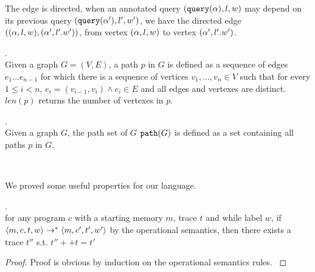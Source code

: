 \documentclass[a4paper,11pt]{article}
\begin{document}
The edge is directed, when an annotated query $({\tt query}({\alpha}),l,w)$ may depend on its previous query $({\tt query}({\alpha}'),l',w')$, we have the directed
edge $(({\alpha},l,w), ({\alpha}',l'.w'))$, 
from vertex $(\alpha,l,w) $ to vertex $({\alpha}',l'.w')$.
%
%
\begin{defn}[path ($p$)].
\\
Given a graph $G=(V,E)$, a path $p$ in $G$ is defined as a sequence of edges $e_1\ldots e_{n - 1}$ for which there is a sequence of vertices $v_1, \ldots, v_n \in V$ 
such that for every $1 \leq i < n$, $e_i=(v_{i-1},v_{i}) \land e_i \in E$  and all edges and vertexes are distinct. $len(p)$ returns the number of vertexes in $p$.
\end{defn}
%
\begin{defn}.
\\
Given a  graph $G$, the path set of $G$ $\mathtt{path}(G)$ is defined as a  set containing all paths $p$ in $G$.
\end{defn}
%
%
\begin{defn}
\label{def:trace-based_adapt}
\\
\end{defn}
%
We proved some useful properties for our language.
\begin{lem}
.
\\
{
for any program $c$ with a starting memory $m$, trace $t$ and while label $w$, if 
$  
\langle m, c, t, w \rangle 
\rightarrow^{*} 
\langle m, c', t', w' \rangle 
$ by the operational semantics, then there exists a trace $t''$ 
s.t. $t'' ++ t = t'$
}
\end{lem}
%
\begin{proof}
{
Proof is obvious by induction on the operational semantics rules.
}
\end{proof}
%
\end{document}
